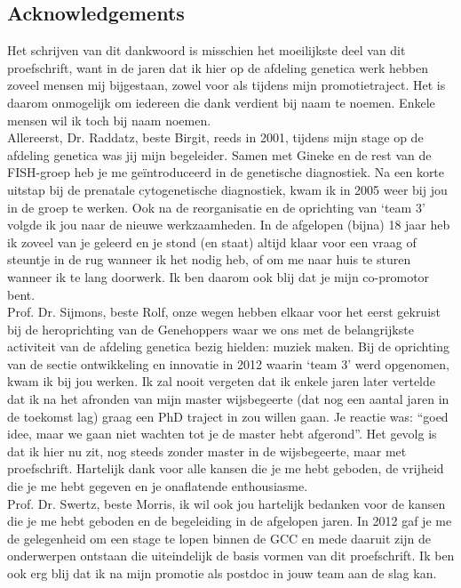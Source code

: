 \begin{appendices}
	
	
	\chapter{Acknowledgements}
	
	Het schrijven van dit dankwoord is misschien het moeilijkste deel van dit proefschrift, want in de jaren dat ik hier op de afdeling genetica werk hebben zoveel mensen mij bijgestaan, zowel voor als tijdens mijn promotietraject. Het is daarom onmogelijk om iedereen die dank verdient bij naam te noemen. Enkele mensen wil ik toch bij naam noemen.\\
	
	\noindent Allereerst, Dr. Raddatz, beste Birgit, reeds in 2001, tijdens mijn stage op de afdeling genetica was jij mijn begeleider. Samen met Gineke en de rest van de FISH-groep heb je me geïntroduceerd in de genetische diagnostiek. Na een korte uitstap bij de prenatale cytogenetische diagnostiek, kwam ik in 2005 weer bij jou in de groep te werken. Ook na de reorganisatie en de oprichting van ‘team 3’ volgde ik jou naar de nieuwe werkzaamheden. In de afgelopen (bijna) 18 jaar heb ik zoveel van je geleerd en je stond (en staat) altijd klaar voor een vraag of steuntje in de rug wanneer ik het nodig heb, of om me naar huis te sturen wanneer ik te lang doorwerk. Ik ben daarom ook blij dat je mijn co-promotor bent.\\ 
	
	\noindent Prof. Dr. Sijmons, beste Rolf, onze wegen hebben elkaar voor het eerst gekruist bij de heroprichting van de Genehoppers waar we ons met de belangrijkste activiteit van de afdeling genetica bezig hielden: muziek maken. Bij de oprichting van de sectie ontwikkeling en innovatie in 2012 waarin ‘team 3’ werd opgenomen, kwam ik bij jou werken. Ik zal nooit vergeten dat ik enkele jaren later vertelde dat ik na het afronden van mijn master wijsbegeerte (dat nog een aantal jaren in de toekomst lag) graag een PhD traject in zou willen gaan. Je reactie was: “goed idee, maar we gaan niet wachten tot je de master hebt afgerond”. Het gevolg is dat ik hier nu zit, nog steeds zonder master in de wijsbegeerte, maar met proefschrift. Hartelijk dank voor alle kansen die je me hebt geboden, de vrijheid die je me hebt gegeven en je onaflatende enthousiasme.\\ 
	
	\noindent Prof. Dr. Swertz, beste Morris, ik wil ook jou hartelijk bedanken voor de kansen die je me hebt geboden en de begeleiding in de afgelopen jaren. In 2012 gaf je me de gelegenheid om een stage te lopen binnen de GCC en mede daaruit zijn de onderwerpen ontstaan die uiteindelijk de basis vormen van dit proefschrift. Ik ben ook erg blij dat ik na mijn promotie als postdoc in jouw team aan de slag kan.\\ 
	

\end{appendices}
